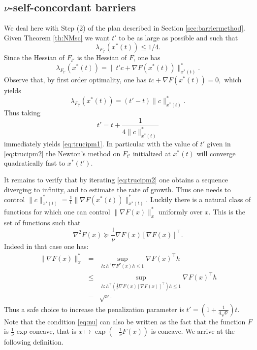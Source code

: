 \subsection{$\nu$-self-concordant barriers}
We deal here with Step (2) of the plan described in Section \ref{sec:barriermethod}. Given Theorem \ref{th:NMsc} we want $t'$ to be as large as possible and such that
\begin{equation} \label{eq:trucipm1}
\lambda_{F_{t'}}(x^*(t) ) \leq 1/4 .
\end{equation}
Since the Hessian of $F_{t'}$ is the Hessian of $F$, one has
$$\lambda_{F_{t'}}(x^*(t) ) = \|t' c + \nabla F(x^*(t)) \|_{x^*(t)}^* .$$
Observe that, by first order optimality, one has 
$t c + \nabla F(x^*(t))  = 0,$
which yields
\begin{equation} \label{eq:trucipm11}
\lambda_{F_{t'}}(x^*(t) ) = (t'-t) \|c\|^*_{x^*(t)} .
\end{equation}
Thus taking 
\begin{equation} \label{eq:trucipm2}
t' = t + \frac{1}{4 \|c\|^*_{x^*(t)}}
\end{equation} 
immediately yields \eqref{eq:trucipm1}. In particular with the value of $t'$ given in \eqref{eq:trucipm2} the Newton's method on $F_{t'}$ initialized at $x^*(t)$ will converge quadratically fast to $x^*(t')$.

It remains to verify that by iterating \eqref{eq:trucipm2} one obtains a sequence diverging to infinity, and to estimate the rate of growth. Thus one needs to control $\|c\|^*_{x^*(t)} = \frac1{t} \|\nabla F(x^*(t))\|_{x^*(t)}^*$. Luckily there is a natural class of functions for which one can control $\|\nabla F(x)\|_x^*$ uniformly over $x$. This is the set of functions such that
\begin{equation} \label{eq:nu}
\nabla^2 F(x) \succeq \frac1{\nu} \nabla F(x) [\nabla F(x) ]^{\top} .
\end{equation}
Indeed in that case one has:
\begin{eqnarray*}
\|\nabla F(x)\|_x^* & = & \sup_{h : h^{\top} \nabla F^2(x) h \leq 1} \nabla F(x)^{\top} h \\
& \leq & \sup_{h : h^{\top} \left( \frac1{\nu} \nabla F(x) [\nabla F(x) ]^{\top} \right) h \leq 1} \nabla F(x)^{\top} h \\
& = & \sqrt{\nu} .
\end{eqnarray*}
Thus a safe choice to increase the penalization parameter is $t' = \left(1 + \frac1{4\sqrt{\nu}}\right) t$. Note that the condition \eqref{eq:nu} can also be written as the fact that the function $F$ is $\frac1{\nu}$-exp-concave, that is $x \mapsto \exp(- \frac1{\nu} F(x))$ is concave. We arrive at the following definition.

